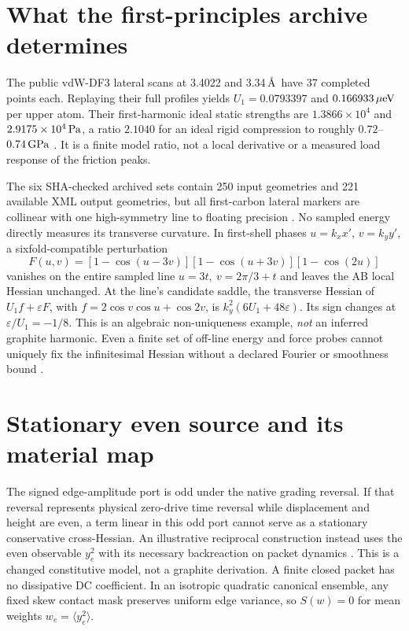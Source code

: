 \documentclass[9pt,a4paper,twocolumn]{extarticle}
\begin{document}
\section{What the first-principles archive determines}
The public vdW-DF3 lateral scans at 3.4022 and 3.34\,\AA\ have 37 completed points each. Replaying their full profiles yields $U_1=0.0793397$ and $0.166933\,\mu{\rm eV}$ per upper atom. Their first-harmonic ideal static strengths are $1.3866\times10^4$ and $2.9175\times10^4\,{\rm Pa}$, a ratio $2.1040$ for an ideal rigid compression to roughly $0.72$--$0.74\,{\rm GPa}$ \cite{lebedeva,zenodo,udrecord}. It is a finite model ratio, not a local derivative or a measured load response of the friction peaks.

The six SHA-checked archived sets contain 250 input geometries and 221 available XML output geometries, but all first-carbon lateral markers are collinear with one high-symmetry line to floating precision \cite{udrecord,zenodo}. No sampled energy directly measures its transverse curvature. In first-shell phases $u=k_xx'$, $v=k_yy'$, a sixfold-compatible perturbation
\begin{equation}
 F(u,v)=[1-\cos(u-3v)][1-\cos(u+3v)][1-\cos(2u)] \label{eq:null}
\end{equation}
vanishes on the entire sampled line $u=3t,\ v=2\pi/3+t$ and leaves the AB local Hessian unchanged. At the line's candidate saddle, the transverse Hessian of $U_1f+\varepsilon F$, with $f=2\cos v\cos u+\cos2v$, is $k_y^2(6U_1+48\varepsilon)$. Its sign changes at $\varepsilon/U_1=-1/8$. This is an algebraic non-uniqueness example, \emph{not} an inferred graphite harmonic. Even a finite set of off-line energy and force probes cannot uniquely fix the infinitesimal Hessian without a declared Fourier or smoothness bound \cite{udrecord}.

\section{Stationary even source and its material map}
The signed edge-amplitude port is odd under the native grading reversal. If that reversal represents physical zero-drive time reversal while displacement and height are even, a term linear in this odd port cannot serve as a stationary conservative cross-Hessian. An illustrative reciprocal construction instead uses the even observable $y_e^2$ with its necessary backreaction on packet dynamics \cite{udphysics}. This is a changed constitutive model, not a graphite derivation. A finite closed packet has no dissipative DC coefficient. In an isotropic quadratic canonical ensemble, any fixed skew contact mask preserves uniform edge variance, so $S(w)=0$ for mean weights $w_e=\langle y_e^2\rangle$.
\end{document}

